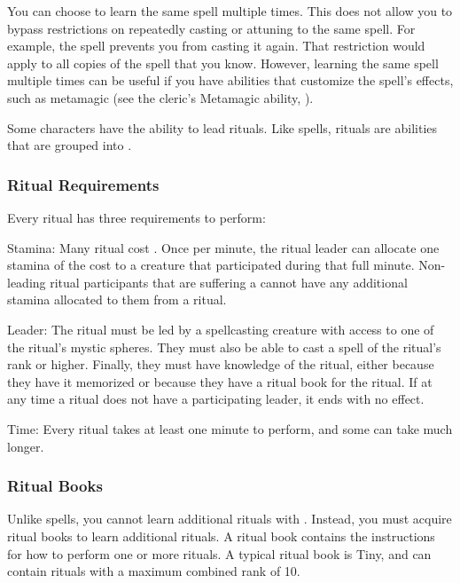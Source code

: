     You can choose to learn the same spell multiple times.
    This does not allow you to bypass restrictions on repeatedly casting or attuning to the same spell.
    For example, the  spell \briefly prevents you from casting it again.
    That restriction would apply to all copies of the spell that you know.
    However, learning the same spell multiple times can be useful if you have abilities that customize the spell's effects, such as metamagic (see the cleric's Metamagic ability, ).

    Some characters have the ability to lead rituals.
    Like spells, rituals are \magical abilities that are grouped into .

    \subsubsection{Ritual Requirements}\label{Ritual Requirements}
      Every ritual has three requirements to perform:
      \begin{raggeditemize}
        \item Stamina: Many ritual cost .
          Once per minute, the ritual leader can allocate one stamina of the cost to a creature that participated during that full minute.
          Non-leading ritual participants that are suffering a  cannot have any additional stamina allocated to them from a ritual.
        \item Leader: The ritual must be led by a spellcasting creature with access to one of the ritual's mystic spheres.
          They must also be able to cast a spell of the ritual's rank or higher.
          Finally, they must have knowledge of the ritual, either because they have it memorized or because they have a ritual book for the ritual.
          If at any time a ritual does not have a participating leader, it ends with no effect.
        \item Time: Every ritual takes at least one minute to perform, and some can take much longer.
      \end{raggeditemize}

    \subsubsection{Ritual Books}\label{Ritual Books}
      Unlike spells, you cannot learn additional rituals with .
      Instead, you must acquire ritual books to learn additional rituals.
      A ritual book contains the instructions for how to perform one or more rituals.
      A typical ritual book is Tiny, and can contain rituals with a maximum combined rank of 10.

